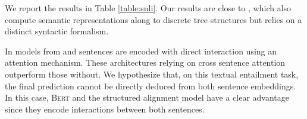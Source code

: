We report the results in Table \ref{table:snli}. Our results are close to \textcite{choi_18}, which also compute semantic representations along to discrete tree structures but relies on a distinct syntactic formalism.

In models from \textcite{liu_18} and \textcite{zhang_20} sentences are encoded with direct interaction using an attention mechanism. These architectures relying on cross sentence attention outperform those without.
We hypothesize that, 
on this textual entailment task, the final prediction cannot be directly deduced from both sentence embeddings. In this case, \textsc{Bert} and the structured alignment model have a clear advantage since they encode interactions between both sentences.







